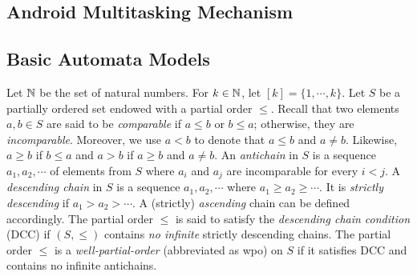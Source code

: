
\subsection{Android Multitasking Mechanism} \label{sec:amm}


\subsection{Basic Automata Models}

Let ${\mathbb{N} }$ be the set of natural numbers. For $k \in {\mathbb{N} }$, let $[k]=\{1,\cdots, k\}$. %
%
Let $S$ be a partially ordered set endowed with a partial order $\leq$. Recall that two elements $a,b\in S$ are said to be \emph{comparable} if $a\leq b$ or $b\leq a$; otherwise, they are \emph{incomparable}.
Moreover, we use $a < b$ to denote that $a \leq b$ and $a \neq b$. Likewise, $a \geq b$ if $b \leq a$ and $a > b$ if $a \geq b$ and $a \neq b$.
%
An \emph{antichain} in $S$ is a sequence $a_1, a_2, \cdots$ of elements from $S$ where $a_i$ and $a_j$ are incomparable for every $ i < j$.
A \emph{descending chain} in $S$ is a sequence $a_1, a_2, \cdots$ where $a_1 \geq a_2 \geq \cdots$. It is \emph{strictly descending} if $a_1 > a_2 > \cdots$. 
A (strictly) \emph{ascending} chain can be defined accordingly.  
%
The partial order $\leq$ is said to satisfy %
the \emph{descending chain condition} (DCC) if $(S, \leq)$ contains \emph{no infinite} strictly descending chains.
%
The partial order $\leq$ is a \emph{well-partial-order} (abbreviated as wpo) on $S$ if it satisfies DCC and contains no infinite antichains. 
%

